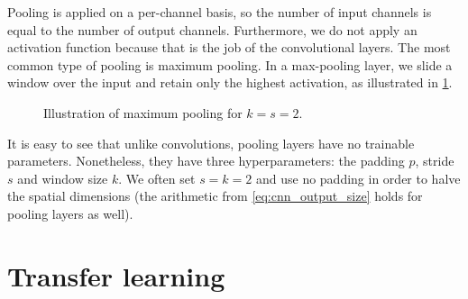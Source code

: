 \documentclass[../main.tex]{subfiles}
\begin{document}
Pooling is applied on a per-channel basis, so the number of input channels is equal to the number of output channels.
Furthermore, we do not apply an activation function because that is the job of the convolutional layers.
The most common type of pooling is maximum pooling.
In a max-pooling layer, we slide a window over the input and retain only the highest activation, as illustrated in \cref{fig:maxpool}.
\begin{figure}
    \centering
    \caption{Illustration of maximum pooling for $k=s=2$.}
    \label{fig:maxpool}
\end{figure}
It is easy to see that unlike convolutions, pooling layers have no trainable parameters.
Nonetheless, they have three hyperparameters: the padding $p$, stride $s$ and window size $k$.
We often set $s=k=2$ and use no padding in order to halve the spatial dimensions (the arithmetic from \cref{eq:cnn_output_size} holds for pooling layers as well).

\section{Transfer learning}
\end{document}

